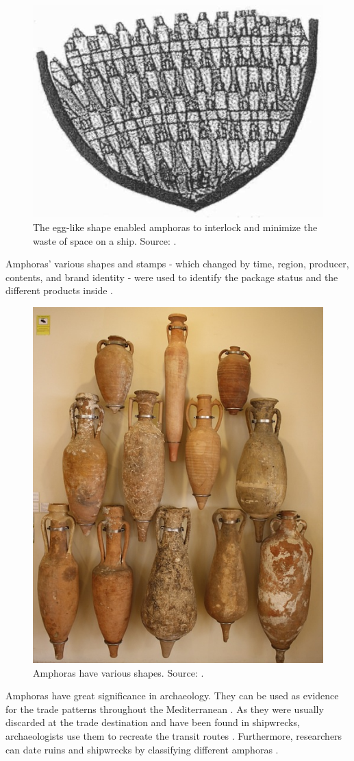 \documentclass[a4paper, 11pt, oneside]{article}
\begin{document}
\begin{figure}[ht]
  \begin{center}
    \includegraphics[width=.6\textwidth]{amphora_stowage_aboard_ship.png}
  \end{center}
  \caption{The egg-like shape enabled amphoras to interlock and minimize the waste of space on a ship.
  Source: \cite{twede2002commercial}.}
\end{figure}

Amphoras' various shapes and stamps - which changed by time, region, producer, contents, and brand
identity - were used to identify the package status and the different products inside
\cite{twede2002commercial, worldhistory}.

\begin{figure}[ht]
  \begin{center}
    \includegraphics[width=.5\textwidth]{amphora_various_shapes.jpg}
  \end{center}
  \caption{Amphoras have various shapes. Source: \cite{worldhistory}.}
  \label{fig:amphora}
\end{figure}

Amphoras have great significance in archaeology. They can be used as evidence for the trade patterns throughout
the Mediterranean \cite{twede2002commercial}. As they were usually discarded at the trade destination and have been
found in shipwrecks, archaeologists use them to recreate the transit routes \cite{twede2002commercial}. Furthermore,
researchers can date ruins and shipwrecks by classifying different amphoras \cite{twede2002commercial, grace1985middle}.
\end{document}
